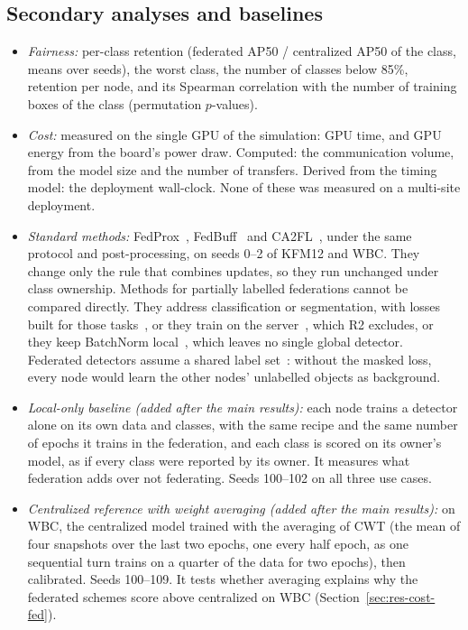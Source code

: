 \documentclass[pdflatex,sn-mathphys-num]{sn-jnl}
\begin{document}
\subsection{Secondary analyses and baselines}\label{sec:secondary}
\begin{itemize}
\item \emph{Fairness:} per-class retention (federated AP50 / centralized AP50 of the class, means over seeds), the worst class, the number of classes below 85\%, retention per node, and its Spearman correlation with the number of training boxes of the class (permutation $p$-values).
\item \emph{Cost:} measured on the single GPU of the simulation: GPU time, and GPU energy from the board's power draw. Computed: the communication volume, from the model size and the number of transfers. Derived from the timing model: the deployment wall-clock. None of these was measured on a multi-site deployment.
\item \emph{Standard methods:} FedProx~\cite{li2020fedprox}, FedBuff~\cite{nguyen2022fedbuff} and CA2FL~\cite{wang2024ca2fl}, under the same protocol and post-processing, on seeds 0--2 of KFM12 and WBC. They change only the rule that combines updates, so they run unchanged under class ownership. Methods for partially labelled federations cannot be compared directly. They address classification or segmentation, with losses built for those tasks~\cite{yu2020fedaws,li2021fedrs,fan2023fedgela,deng2023fedlsm,xu2023fedmenu,wang2024condistfl}, or they train on the server~\cite{yu2020fedaws,luo2021ccvr}, which R2 excludes, or they keep BatchNorm local~\cite{li2021fedbn}, which leaves no single global detector. Federated detectors assume a shared label set~\cite{liu2020fedvision,li2025ultraflwr}: without the masked loss, every node would learn the other nodes' unlabelled objects as background.
\item \emph{Local-only baseline (added after the main results):} each node trains a detector alone on its own data and classes, with the same recipe and the same number of epochs it trains in the federation, and each class is scored on its owner's model, as if every class were reported by its owner. It measures what federation adds over not federating. Seeds 100--102 on all three use cases.
\item \emph{Centralized reference with weight averaging (added after the main results):} on WBC, the centralized model trained with the averaging of CWT (the mean of four snapshots over the last two epochs, one every half epoch, as one sequential turn trains on a quarter of the data for two epochs), then calibrated. Seeds 100--109. It tests whether averaging explains why the federated schemes score above centralized on WBC (Section~\ref{sec:res-cost-fed}).
\end{itemize}
\end{document}
